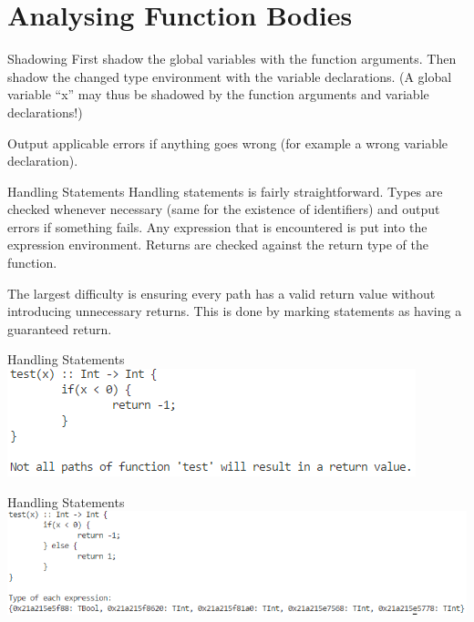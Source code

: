 \documentclass[10pt]{beamer}
\begin{document}
\section{Analysing Function Bodies}
\begin{frame}{Shadowing}
    First shadow the global variables with the function arguments. Then shadow the changed type environment with the variable declarations. (A global variable ``x'' may thus be shadowed by the function arguments and variable declarations!)

    Output applicable errors if anything goes wrong (for example a wrong variable declaration).
\end{frame}

\begin{frame}{Handling Statements}
    Handling statements is fairly straightforward. Types are checked whenever necessary (same for the existence of identifiers) and output errors if something fails. Any expression that is encountered is put into the expression environment. Returns are checked against the return type of the function.
    
    The largest difficulty is ensuring every path has a valid return value without introducing unnecessary returns. This is done by marking statements as having a guaranteed return.
\end{frame}

\begin{frame}{Handling Statements}
    \includegraphics[width=\textwidth]{presentation2/test1.png}
\end{frame}

\begin{frame}{Handling Statements}
    \includegraphics[width=\textwidth]{presentation2/test2.png}
\end{frame}
\end{document}
